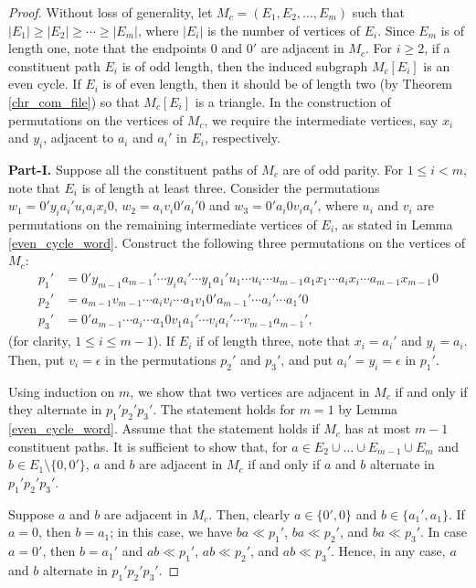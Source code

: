 \documentclass[10pt,a4paper]{amsart}
\begin{document}
\begin{proof}
	Without loss of generality, let $M_c = (E_1,E_2, \ldots, E_m)$ such that $|E_1| \ge |E_2|\ge \cdots \ge |E_m|$, where $|E_i|$ is the number of vertices of $E_i$.  Since $E_m$ is of length one, note that the endpoints $0$ and $0'$ are adjacent in $M_c$. For $i \ge 2$, if a constituent path $E_i$ is of odd length, then the induced subgraph $M_c[E_i]$ is an even cycle. If $E_i$ is of even length, then it should be of length two (by Theorem \ref{chr_com_file}) so that $M_c[E_i]$ is a triangle. In the construction of permutations on the vertices of $M_c$, we require the intermediate vertices, say $x_i$ and $y_i$, adjacent to $a_i$ and $a_i'$ in $E_i$, respectively. 
	
	\noindent\textbf{Part-I.} Suppose all the constituent paths of $M_c$ are of odd parity.
	For $1 \le i < m$, note that $E_i$ is of length at least three. Consider the permutations $w_1 = 0'y_ia_i' u_i a_i x_i 0$, $w_2 = a_i v_i 0' a_i' 0$ and $w_3 = 0' a_i 0 v_i a_i'$, where $u_i$ and $v_i$ are permutations on the remaining intermediate vertices of $E_i$, as stated in Lemma \ref{even_cycle_word}. 
	Construct the following three permutations on the vertices of $M_c$: 
	\begin{align*}
		p_1' &= 0' y_{m-1} a_{m-1}' \cdots y_i a_i' \cdots y_1 a_1' u_{1} \cdots u_i  \cdots  u_{m-1}    a_1 x_1 \cdots a_i x_i   \cdots  a_{m-1} x_{m-1} 0 \\
		p_2' &= a_{m-1}v_{m-1}        \cdots  a_iv_i \cdots a_1 v_1    0'  a_{m-1}'    \cdots a_{i}' \cdots a_1'0\\
		p_3' &= 0'a_{m-1} \cdots a_{i} \cdots a_1 0 v_{1}a_{1}' \cdots v_ia_i' \cdots      v_{m-1} a_{m-1}',
	\end{align*} (for clarity, $1 \le i \le m-1$).
	If $E_i$ if of length three, note that $x_i = a_i'$ and $y_i = a_i$. Then, put $v_i = \epsilon$ in the permutations $p_2'$ and $p_3'$, and put $a_i' = y_i = \epsilon$ in $p_1'$. 
	
	Using induction on $m$, we show that two vertices are adjacent in $M_c$ if and only if they alternate in $p_1'p_2'p_3'$. 
	The statement holds for $m = 1$ by Lemma \ref{even_cycle_word}. Assume that the statement holds if $M_c$ has at most $m - 1$ constituent paths. It is sufficient to show that, for $a \in  E_2 \cup \ldots \cup E_{m-1} \cup E_m$ and $b \in E_{1} \setminus \{0,0'\}$, $a$ and $b$ are adjacent in $M_c$ if and only if $a$ and $b$ alternate in $p_1'p_2'p_3'$.
	
	Suppose  $a$ and $b$ are adjacent in $M_c$. Then, clearly $a \in \{0',0\}$ and $b \in \{a_{1}', a_{1}\}$. If $a = 0$, then $b = a_{1}$; in this case, we have $ba \ll p_1'$, $ba \ll p_2'$, and $ba \ll  p_3'$. In case $a = 0'$, then $b = a_{1}'$ and $ab \ll p_1'$, $ab \ll p_2'$, and $ab \ll p_3'$. Hence, in any case, $a$ and $b$ alternate in $p_1'p_2'p_3'$.
	

\end{proof}
\end{document}
